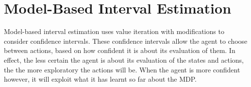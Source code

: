 \section{Model-Based Interval Estimation }
\label{sec:mbie}
Model-based interval estimation uses value iteration with modifications to consider confidence intervals. These confidence intervals allow the agent to choose between actions, based on how confident it is about its evaluation of them. In effect, the less certain the agent is about its evaluation of the states and actions, the the more exploratory the actions will be. When the agent is more confident however, it will exploit what it has learnt so far about the MDP. \parencite{dietterich2013pac}





